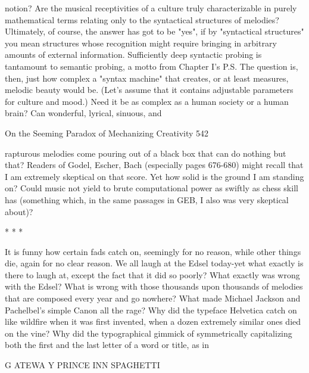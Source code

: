 notion?
         Are the musical receptivities of a culture truly characterizable in purely
mathematical terms relating only to the syntactical structures of melodies? Ultimately,
of course, the answer has got to be "yes", if by "syntactical structures" you mean
structures whose recognition might require bringing in arbitrary amounts of external
information. Sufficiently deep syntactic probing is tantamount to semantic probing, a
motto from Chapter I's P.S. The question is, then, just how complex a "syntax
machine" that creates, or at least measures, melodic beauty would be. (Let's assume
that it contains adjustable parameters for culture and mood.) Need it be as complex as
a human society or a human brain? Can wonderful, lyrical, sinuous, and




On the Seeming Paradox of Mechanizing Creativity                                    542

rapturous melodies come pouring out of a black box that can do nothing but that?
Readers of Godel, Escher, Bach (especially pages 676-680) might recall that I am
extremely skeptical on that score. Yet how solid is the ground I am standing on?
Could music not yield to brute computational power as swiftly as chess skill has
(something which, in the same passages in GEB, I also was very skeptical about)?

                                       *   *    *

        It is funny how certain fads catch on, seemingly for no reason, while other
things die, again for no clear reason. We all laugh at the Edsel today-yet what exactly
is there to laugh at, except the fact that it did so poorly? What exactly was wrong with
the Edsel? What is wrong with those thousands upon thousands of melodies that are
composed every year and go nowhere? What made Michael Jackson and Pachelbel's
simple Canon all the rage? Why did the typeface Helvetica catch on like wildfire
when it was first invented, when a dozen extremely similar ones died on the vine?
Why did the typographical gimmick of symmetrically capitalizing both the first and
the last letter of a word or title, as in


       G ATEWA Y                                       PRINCE
           INN                                 SPAGHETTI

